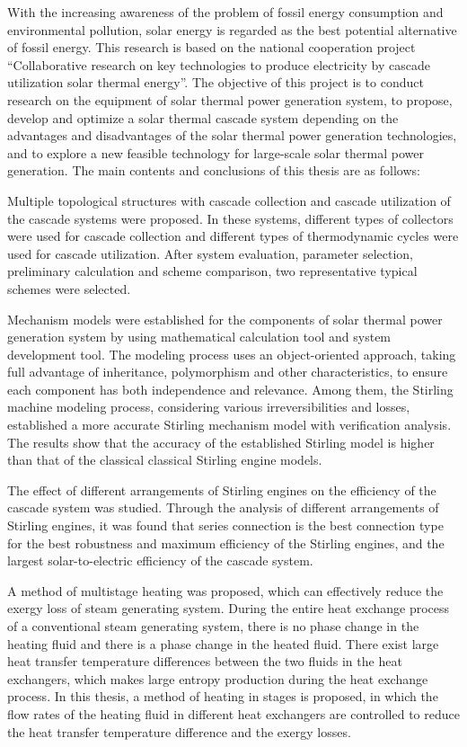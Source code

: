\enabstract
{
With the increasing awareness of the problem of fossil energy consumption and environmental pollution, solar energy is regarded as the best potential alternative of fossil energy. This research is based on the national cooperation project ``Collaborative research on key technologies to produce electricity by cascade utilization solar thermal energy''. The objective of this project is to conduct research on the equipment of solar thermal power generation system, to propose, develop and optimize a solar thermal cascade system depending on the advantages and disadvantages of the solar thermal power generation technologies, and to explore a new feasible technology for large-scale solar thermal power generation. The main contents and conclusions of this thesis are as follows:

Multiple topological structures with cascade collection and cascade utilization of the cascade systems were proposed. In these systems, different types of collectors were used for cascade collection and different types of thermodynamic cycles were used for cascade utilization. After system evaluation, parameter selection, preliminary calculation and scheme comparison, two representative typical schemes were selected.

Mechanism models were established for the components of solar thermal power generation system by using mathematical calculation tool and system development tool. The modeling process uses an object-oriented approach, taking full advantage of inheritance, polymorphism and other characteristics, to ensure each component has both independence and relevance. Among them, the Stirling machine modeling process, considering various irreversibilities and losses, established a more accurate Stirling mechanism model with verification analysis. The results show that the accuracy of the established Stirling model is higher than that of the classical classical Stirling engine models.

The effect of different arrangements of Stirling engines on the efficiency of the cascade system was studied. Through the analysis of different arrangements of Stirling engines, it was found that series connection is the best connection type for the best robustness and maximum efficiency of the Stirling engines, and the largest solar-to-electric efficiency of the cascade system.

A method of multistage heating was proposed, which can effectively reduce the exergy loss of steam generating system. During the entire heat exchange process of a conventional steam generating system, there is no phase change in the heating fluid and there is a phase change in the heated fluid. There exist large heat transfer temperature differences between the two fluids in the heat exchangers, which makes large entropy production during the heat exchange process. In this thesis, a method of heating in stages is proposed, in which the flow rates of the heating fluid in different heat exchangers are controlled to reduce the heat transfer temperature difference and the exergy losses. 

}
